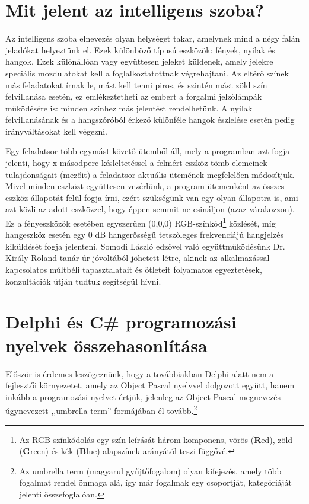 \documentclass[tocnopagenum]{thesis-ekf}
\theoremstyle{definition}
\theoremstyle{remark}
\begin{document}
	\section{Mit jelent az intelligens szoba?}
	Az intelligens szoba elnevezés olyan helységet takar, amelynek mind a négy falán jeladókat helyeztünk el.
	Ezek különböző típusú eszközök: fények, nyilak és hangok. 
	Ezek különállóan vagy együttesen jeleket küldenek, amely jelekre speciális mozdulatokat kell a foglalkoztatottnak végrehajtani.
	Az eltérő színek más feladatokat írnak le, mást kell tenni piros, és szintén mást zöld szín felvillanása esetén, ez emlékeztetheti az embert a forgalmi jelzőlámpák működésére is: minden színhez más jelentést rendelhetünk. A nyilak felvillanásának és a hangszóróból érkező különféle hangok észlelése esetén pedig irányváltásokat kell végezni.
	
	Egy feladatsor több egymást követő ütemből áll, mely a programban azt fogja jelenti, hogy x másodperc késleltetéssel a felmért eszköz tömb elemeinek tulajdonságait (mezőit) a feladatsor aktuális ütemének megfelelően módosítjuk. Mivel minden eszközt együttesen vezérlünk, a program ütemenként az összes eszköz állapotát felül fogja írni, ezért szükségünk van egy olyan állapotra is, ami azt közli az adott eszközzel, hogy éppen semmit ne csináljon (azaz várakozzon). Ez a fényeszközök esetében egyszerűen (0,0,0) RGB-színkód\footnote{Az RGB-színkódolás egy szín leírását három komponens, vörös (\textbf{R}ed), zöld (\textbf{G}reen) és kék (\textbf{B}lue) alapszínek arányától teszi függővé.} közlését, míg hangeszköz esetén egy 0 dB hangerősségű tetszőleges frekvenciájú hangjelzés kiküldését fogja jelenteni.
	Somodi László edzővel való együttműködésünk Dr. Király Roland tanár úr jóvoltából jöhetett létre, akinek az alkalmazással kapcsolatos múltbéli tapasztalatait és  ötleteit folyamatos egyeztetések, konzultációk útján tudtuk segítségül hívni.
	\section{Delphi és C\# programozási nyelvek összehasonlítása}
	Először is érdemes leszögeznünk, hogy a továbbiakban Delphi alatt nem a fejlesztői környezetet, amely az Object Pascal nyelvvel dolgozott együtt, hanem inkább a programozási nyelvet értjük, jelenleg az Object Pascal megnevezés úgynevezett ,,umbrella term'' formájában él tovább.\footnote{Az umbrella term (magyarul gyűjtőfogalom) olyan kifejezés, amely több fogalmat rendel önmaga alá, így már fogalmak egy csoportját, kategóriáját jelenti összefoglalóan.} \cite{sof_delphi}
	
\end{document}
